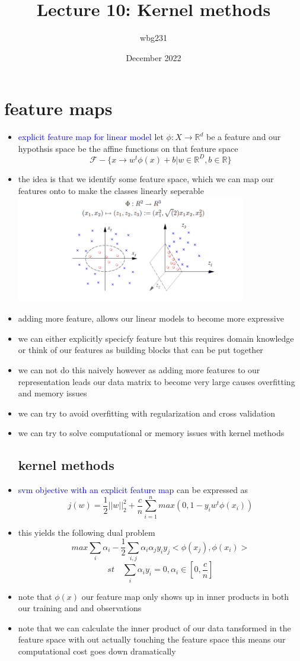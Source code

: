 \documentclass{article}
\title{Lecture 10: Kernel methods}
\author{wbg231 }
\date{December 2022}
\begin{document}
\maketitle

\section{feature maps }
\begin{itemize}
\item \textcolor{blue}{explicit feature map for linear model} let $\phi:X\rightarrow\mathbb{R}^{d}$ be a feature and our hypothsis space be the affine functions on that feature space $$\mathcal{F}-\{x\rightarrow w^{t}\phi(x)+b|w\in \mathbb{R}^{D}, b\in \mathbb{R}\}$$
\item the idea is that we identify some feature space, which we can map our features onto to make the classes linearly seperable \\ \includegraphics*[width=10cm]{images/Screenshot 2023-05-12 at 3.56.50 PM.png}
\item  adding more feature, allows our linear models to become more expressive
\item we can either explicitly specicfy feature but this requires domain knowledge or think of our features as building blocks that can be put together
\item we can not do this naively however as adding more features to our representation leads our data matrix to become very large causes overfitting and memory issues 
\item we can try to avoid overfitting with regularization and cross validation 
\item we can try to solve computational or memory issues with kernel methods 
\subsection*{kernel methods }
\item \textcolor{blue}{svm objective with an explicit feature map} can be expressed as $$j(w)=\frac{1}{2}||w||_{2}^2+\frac{c}{n}\sum_{i=1}^{n}max(0,1-y_iw^{t}\phi(x_i))$$
\item this yields the following dual problem $$max \sum_{i}\alpha_{i}-\frac{1}{2}\sum_{i,j}\alpha_i\alpha_jy_iy_j<\phi(x_j),\phi(x_i)>$$ $$st\quad \sum_{i}\alpha_iy_i=0, \alpha_{i}\in [0,\frac{c}{n}]$$
\item note that $\phi(x)$ our feature map only shows up in inner products in both our training and and observations 
\item note that we can calculate the inner product of our data tansformed in the feature space with out actually touching the feature space this means our computational cost goes down dramatically

\end{itemize}
\end{document}
